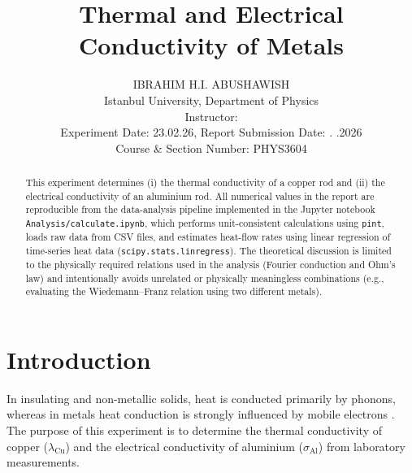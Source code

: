 \documentclass[journal]{IEEEtran}
\begin{document}
\title{Thermal and Electrical Conductivity of Metals}
\author{IBRAHIM H.I. ABUSHAWISH \\
Istanbul University, Department of Physics \\
Instructor: \hspace{4cm} \\
Experiment Date: 23.02.26, Report Submission Date:  . .2026\\
Course \& Section Number: PHYS3604}


\maketitle

\begin{abstract}
This experiment determines (i) the thermal conductivity of a copper rod and (ii) the
electrical conductivity of an aluminium rod. All numerical values in the report are
reproducible from the data-analysis pipeline implemented in the Jupyter notebook
\texttt{Analysis/calculate.ipynb}, which performs unit-consistent calculations using
\texttt{pint}, loads raw data from CSV files, and estimates heat-flow rates using linear
regression of time-series heat data (\texttt{scipy.stats.linregress}). The theoretical
discussion is limited to the physically required relations used in the analysis
(Fourier conduction and Ohm's law) and intentionally avoids unrelated or
physically meaningless combinations (e.g., evaluating the Wiedemann--Franz relation
using two different metals).
\end{abstract}

\section{Introduction}
In insulating and non-metallic solids, heat is conducted primarily by phonons, whereas in
metals heat conduction is strongly influenced by mobile electrons \cite{lab_manual}. The
purpose of this experiment is to determine the thermal conductivity of copper
($\lambda_{\text{Cu}}$) and the electrical conductivity of aluminium ($\sigma_{\text{Al}}$)
from laboratory measurements.

\end{document}
